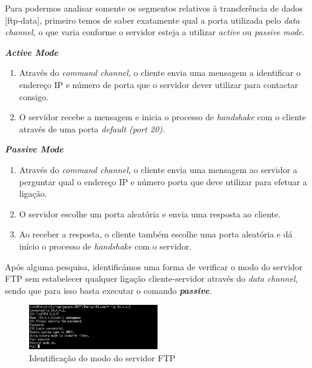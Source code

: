         Para podermos analisar somente os segmentos relativos à transferência de dados [ftp-data], primeiro temos de saber exatamente qual a porta utilizada pelo \textit{data channel,} o que varia conforme o servidor esteja a utilizar \textit{active} ou \textit{passive mode.}

        \textbf{\textit{\large Active Mode}}

        \begin{enumerate}
            
            \item Através do \textit{command channel,} o cliente envia uma mensagem a identificar o endereço IP e número de porta que o servidor dever utilizar para contactar consigo.

            \item O servidor recebe a mensagem e inicia o processo de \textit{handshake} com o cliente através de uma porta \textit{default (port 20).}
            
        \end{enumerate}

        \newpage
        \textbf{\textit{\large Passive Mode}}

        \begin{enumerate}
            
            \item Através do \textit{command channel,} o cliente envia uma mensagem ao servidor a perguntar qual o endereço IP e número porta que deve utilizar para efetuar a ligação.

            \item O servidor escolhe um porta aleatória e envia uma resposta ao cliente.

            \item Ao receber a resposta, o cliente também escolhe uma porta aleatória e dá início o processo de \textit{handshake} com o servidor.

        \end{enumerate}

        Após alguma pesquisa, identificámos uma forma de verificar o modo do servidor FTP sem estabelecer qualquer ligação cliente-servidor através do \textit{data channel}, sendo que para isso basta executar o comando \textit{\textbf{passive}.}

        \begin{figure}
            \centering
            \includegraphics[width=0.5\textwidth]{Imagens/11.png}
            \caption{Identificação do modo do servidor FTP}
            \vspace{-10pt}
        \end{figure}

